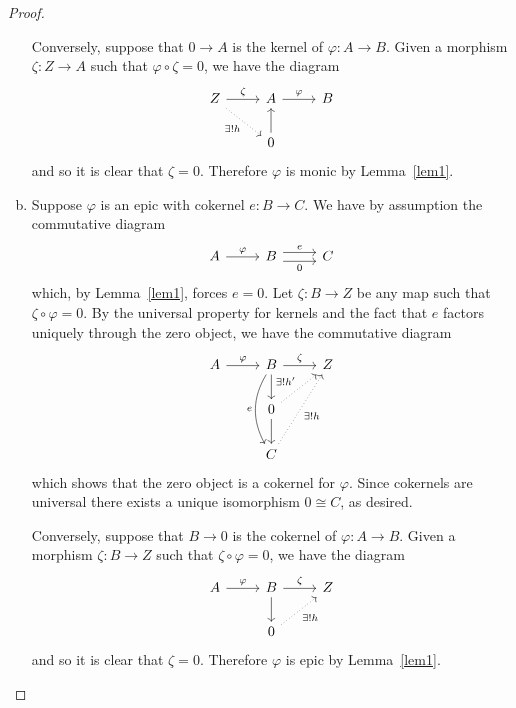 \documentclass[10pt]{amsart}
\begin{document}
\begin{lem}
\begin{proof}
\begin{enumerate}[(a)]
      Conversely, suppose that $0 \rightarrow A$ is the kernel of $\varphi : A \rightarrow B$.
      Given a morphism $\zeta : Z \rightarrow A$ such that $\varphi \circ \zeta = 0$, we have the diagram
      $$\begin{tikzcd}
	Z \arrow[dotted,swap]{rd}{\exists ! h} \arrow{r}{\zeta} &A \arrow{r}{\varphi} &B\\
	& 0\arrow{u}
      \end{tikzcd}$$
      and so it is clear that $\zeta = 0$.
      Therefore $\varphi$ is monic by Lemma~\ref{lem1}.
    \item
      Suppose $\varphi$ is an epic with cokernel $e : B \rightarrow C$.
      We have by assumption the commutative diagram
      $$\begin{tikzcd}
	A\arrow{r}{\varphi} & B \arrow[shift left = 0.75ex]{r}{e} \arrow[shift right=0.75ex, swap]{r}{0} & C
      \end{tikzcd}$$
      which, by Lemma~\ref{lem1}, forces $e = 0$.
      Let $\zeta : B \rightarrow Z$ be any map such that $\zeta \circ \varphi = 0$.
      By the universal property for kernels and the fact that $e$ factors uniquely through the zero object, we have the commutative diagram
      $$\begin{tikzcd}
	A \arrow{r}{\varphi}& B \arrow[bend right,swap]{dd}{e}\arrow{d}\arrow{r}{\zeta}& Z\\
	& 0\arrow{d}\arrow[dotted]{ru}{\exists ! h'}\\
	& C\arrow[dotted, swap]{ruu}{\exists ! h}
      \end{tikzcd}$$
      which shows that the zero object is a cokernel for $\varphi$.
      Since cokernels are universal there exists a unique isomorphism $0 \cong  C$, as desired.
      
      Conversely, suppose that $B \rightarrow 0$ is the cokernel of $\varphi : A \rightarrow B$.
      Given a morphism $\zeta : B \rightarrow Z$ such that $\zeta \circ \varphi= 0$, we have the diagram
      $$\begin{tikzcd}
	A \arrow{r}{\varphi}& B \arrow{d} \arrow{r}{\zeta} & Z\\
	& 0\arrow[dotted,swap]{ur}{\exists ! h}
      \end{tikzcd}$$
      and so it is clear that $\zeta = 0$.
      Therefore $\varphi$ is epic by Lemma~\ref{lem1}.
    \end{enumerate}
  \end{proof}
\end{lem}
\end{document}
